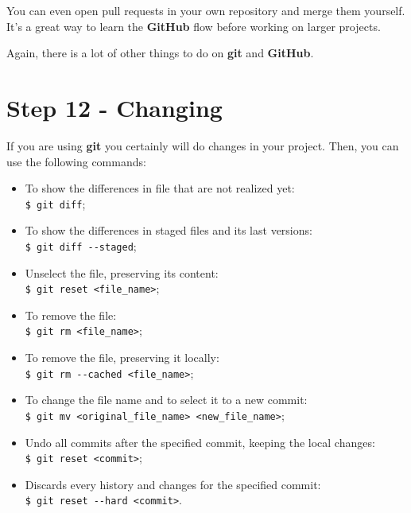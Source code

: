 \documentclass[12pt,a4paper,titlepage,brazil]{article}
\begin{document}
{You can even open pull requests in your own repository and merge them yourself. It’s a great way to learn the {\bf GitHub} flow before working on larger projects.

Again, there is a lot of other things to do on {\bf git} and {\bf GitHub}.


\section{Step 12 - Changing}

If you are using {\bf git} you certainly will do changes in your project. Then, you can use the following commands:

\begin{itemize}
 \item To show the differences in file that are not realized yet:\\
   \texttt{\$ git diff};
 \item To show the differences in staged files and its last versions:\\
   \texttt{\$ git diff -\hspace{0.01cm}-staged};
 \item Unselect the file, preserving its content:\\
   \texttt{\$ git reset <file\_name>};
 \item To remove the file:\\
   \texttt{\$ git rm <file\_name>};
 \item To remove the file, preserving it locally:\\
   \texttt{\$ git rm -\hspace{0.01cm}-cached <file\_name>};
 \item To change the file name and to select it to a new commit:\\
   \texttt{\$ git mv <original\_file\_name> <new\_file\_name>};
 \item Undo all commits after the specified commit, keeping the local changes:\\
   \texttt{\$ git reset <commit>};   
 \item Discards every history and changes for the specified commit:\\
   \texttt{\$ git reset -\hspace{0.01cm}-hard <commit>}.   
\end{itemize}  


}
\end{document}
